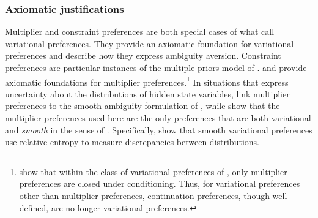 \subsubsection{Axiomatic justifications}%
Multiplier and constraint preferences are both special cases of what \citet{MMR2006a,MMR2006b} call  variational preferences.
They provide an axiomatic foundation for  variational preferences and describe how they express  ambiguity
aversion.
Constraint preferences are particular instances of the multiple priors model of \cite{gilboaschmeidler}.
\citet{TSAxioms} and \citet{CMMM2008} provide  axiomatic foundations for multiplier preferences.\footnote{\citet{AnnaAndrei2010} show that within the class of variational preferences
  of \citet{MMR2006a,MMR2006b}, only multiplier preferences are closed under conditioning.  Thus, for variational preferences other than multiplier preferences, continuation preferences, though well defined,  are no longer
  variational preferences.}
 In situations that express uncertainty about the distributions of  hidden state variables, 
 \citet{hs2005d} link multiplier preferences to  the smooth ambiguity formulation of \citet{kmm,kmm2006}, while  \citet{CMMM2008} show that the
 \citet{hansensargent01} multiplier preferences used here are the only preferences that are both variational  and {\em smooth} in the sense of \citet{kmm}. 
 Specifically, \citet{CMMM2008} show that smooth variational preferences  use
relative entropy to measure discrepancies between distributions.


